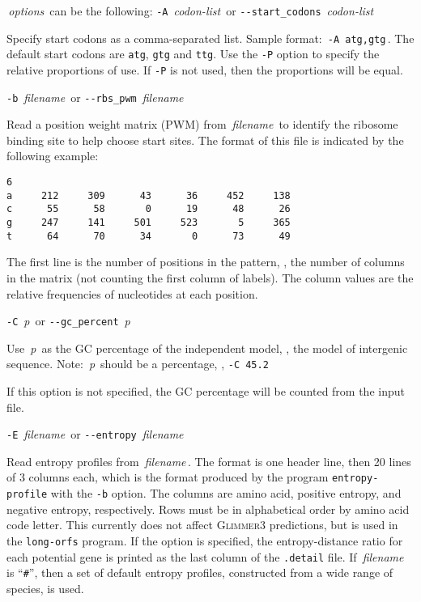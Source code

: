 \documentclass[fleqn,titlepage,11pt]{article}
\def\Desc#1{\,\mbox{\emph{#1}}\,}
\def\Gthree{\textsc{Glimmer3}}
\def\Pg#1{\texttt{#1}}
\begin{document}
\Desc{options} can be the following:
\bl{}\RaggedRight
\exdent
  \verb`-A` \Desc{codon-list} \enskip or \enskip \verb`--start_codons` \Desc{codon-list}

  Specify start codons as a comma-separated list.
  Sample format:  \,\verb`-A atg,gtg`\,.
  The default start codons are \Pg{atg}, \Pg{gtg} and \Pg{ttg}.
  Use the \Pg{-P} option to specify the relative proportions of use.
  If \Pg{-P} is not used, then the proportions will be equal.

\exdent
  \verb`-b` \Desc{filename} \enskip or \enskip \verb`--rbs_pwm` \Desc{filename}

  Read a position weight matrix (PWM) from \Desc{filename} to identify
  the ribosome binding site to help choose start sites.  The format of
  this file is indicated by the following example:
\BSV
\begin{verbatim}
6
a     212     309      43      36     452     138
c      55      58       0      19      48      26
g     247     141     501     523       5     365
t      64      70      34       0      73      49
\end{verbatim}
\ESV
  The first line is the number of positions in the pattern, \ie,
  the number of columns in the matrix (not counting
  the first column of labels).  The column values are the relative
  frequencies of nucleotides at each position.

\exdent
  \verb`-C` \Desc{p} \enskip or \enskip \verb`--gc_percent` \Desc{p}

  Use \Desc{p} as the GC percentage of the independent model, \ie,
  the model of intergenic sequence.
  Note:  \Desc{p} should be a percentage, \eg, \verb`-C 45.2`

  If this option is not specified, the GC percentage will be
  counted from the input file.

\exdent
  \verb`-E` \Desc{filename} \enskip or \enskip \verb`--entropy` \Desc{filename}

  Read entropy profiles from \Desc{filename}.  The format is one header
  line, then 20 lines of 3 columns each, which is the format produced
  by the program \Pg{entropy-profile} with the \Pg{-b} option.
  The columns are amino acid,
  positive entropy, and negative entropy, respectively.  Rows must be in
  alphabetical order by amino acid code letter.  This currently does
  not affect \Gthree{} predictions, but is used in
  the \Pg{long-orfs} program.  If the option is specified, the
  entropy-distance ratio for each potential gene is printed as the last column
  of the \Pg{.detail} file.  If \Desc{filename} is ``\Pg{\#}'', then
  a set of default entropy profiles, constructed from a wide range of
  species, is used.
\end{document}

